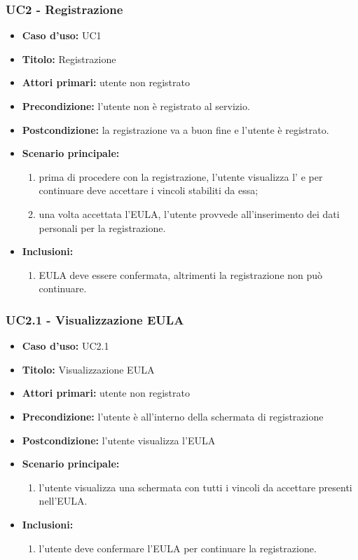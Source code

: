 \documentclass[casi-duso]{subfiles}
\begin{document}
\subsubsection{UC2 - Registrazione}
\label{subsub:uc2utente}
\begin{itemize}
  \item \textbf{Caso d’uso:} UC1 
  \item \textbf{Titolo:} Registrazione
  \item \textbf{Attori primari:} utente non registrato
  \item \textbf{Precondizione:} l'utente non è registrato al servizio.
  \item \textbf{Postcondizione:} la registrazione va a buon fine e l'utente è registrato.
  \item \textbf{Scenario principale:} 
  \begin{enumerate}
    \item prima di procedere con la registrazione, l'utente visualizza l' e per continuare deve accettare i vincoli stabiliti da essa;
    \item una volta accettata l'EULA, l'utente provvede all'inserimento dei dati personali per la registrazione.
  \end{enumerate}  
  \item \textbf{Inclusioni:} 
  \begin{enumerate}
    \item EULA deve essere confermata, altrimenti la registrazione non può continuare.
  \end{enumerate}  
\end{itemize}

\subsubsection{UC2.1 - Visualizzazione EULA}
\label{subsub:uc2.1utente}
\begin{itemize}
  \item \textbf{Caso d’uso:} UC2.1 
  \item \textbf{Titolo:} Visualizzazione EULA
  \item \textbf{Attori primari:} utente non registrato
  \item \textbf{Precondizione:} l'utente è all'interno della schermata di registrazione
  \item \textbf{Postcondizione:} l'utente visualizza l'EULA
  \item \textbf{Scenario principale:} 
  \begin{enumerate}
    \item l'utente visualizza una schermata con tutti i vincoli da accettare presenti nell'EULA.
  \end{enumerate}  
  \item \textbf{Inclusioni:} 
  \begin{enumerate}
    \item l'utente deve confermare l'EULA per continuare la registrazione.
  \end{enumerate}     
\end{itemize}
\end{document}
